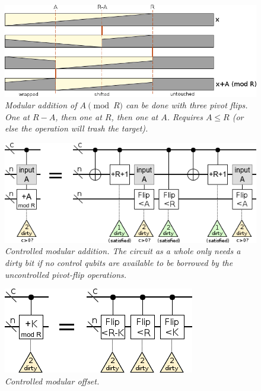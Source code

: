 \documentclass[twocolumn]{article}
\begin{document}
\begin{figure}
  \centering
  \includegraphics[width=\linewidth]{assets/mod-add-from-pivot-flip-bars.png}
  \caption{\em
     Modular addition of $A \pmod{R}$ can be done with three pivot flips.
     One at $R-A$, then one at $R$, then one at $A$.
     Requires $A \leq R$ (or else the operation will trash the target).
   }
  \label{fig:mod-add-from-pivot-flip-bars}
\end{figure}

\begin{figure}
  \centering
  \includegraphics[width=\linewidth]{assets/controlled-modular-addition.png}
  \caption{\em
    Controlled modular addition.
    The circuit as a whole only needs a dirty bit if no control qubits are available to be borrowed by the uncontrolled pivot-flip operations.
  }
  \label{fig:controlled-modular-add}
\end{figure}

\begin{figure}
  \centering
  \includegraphics[width=\linewidth]{assets/controlled-modular-offset.png}
  \caption{\em
    Controlled modular offset.
  }
  \label{fig:controlled-modular-offset}
\end{figure}
\end{document}
